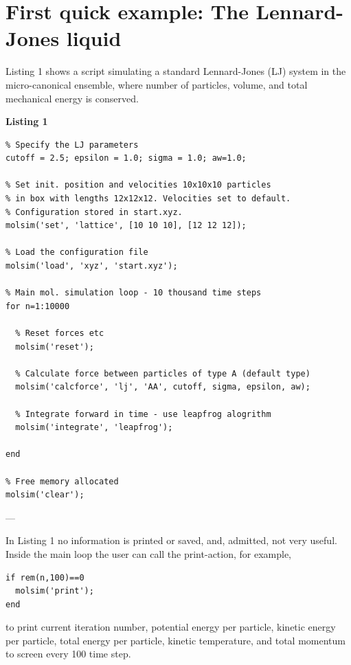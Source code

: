 \documentclass[11pt]{article}
\begin{document}
\section{First quick example: The Lennard-Jones liquid}
Listing 1 shows a script simulating a standard Lennard-Jones (LJ) system in the
micro-canonical ensemble, where number of particles, volume, and total
mechanical energy is conserved.

\bigskip

\noindent \textbf{Listing 1}
\begin{verbatim}
% Specify the LJ parameters
cutoff = 2.5; epsilon = 1.0; sigma = 1.0; aw=1.0;

% Set init. position and velocities 10x10x10 particles 
% in box with lengths 12x12x12. Velocities set to default. 
% Configuration stored in start.xyz. 
molsim('set', 'lattice', [10 10 10], [12 12 12]);

% Load the configuration file
molsim('load', 'xyz', 'start.xyz');

% Main mol. simulation loop - 10 thousand time steps
for n=1:10000

  % Reset forces etc
  molsim('reset');

  % Calculate force between particles of type A (default type)
  molsim('calcforce', 'lj', 'AA', cutoff, sigma, epsilon, aw);

  % Integrate forward in time - use leapfrog alogrithm
  molsim('integrate', 'leapfrog');
 
end

% Free memory allocated
molsim('clear');
\end{verbatim}
---

\noindent In Listing 1 no information is printed or saved, and, admitted, not very
useful. Inside the main loop the user can call the \textsf{print}-action, for
example, 
\begin{verbatim}
if rem(n,100)==0
  molsim('print');
end
\end{verbatim}
to print current iteration number, potential energy per particle, kinetic energy
per particle, total energy per particle, kinetic temperature, and total momentum
to screen every 100 time step.

\begin{center}
\end{center}
\end{document}
